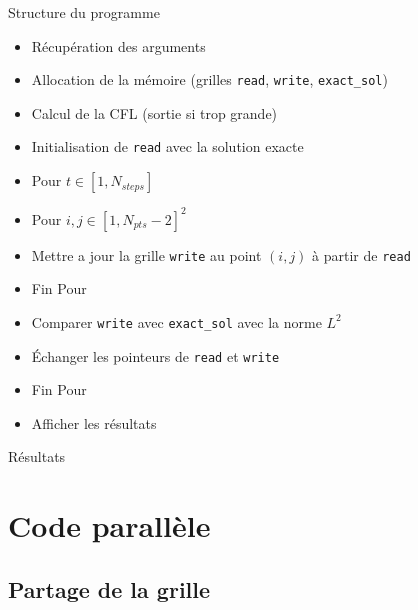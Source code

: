 \documentclass[17pt]{beamer}
\begin{document}
\begin{frame}{Structure du programme}
  \begin{itemize}
  \item Récupération des arguments
  \item Allocation de la mémoire (grilles \texttt{read}, \texttt{write}, \texttt{exact\_sol})
  \item Calcul de la CFL (sortie si trop grande)
  \item Initialisation de \texttt{read} avec la solution exacte
  \item[] Pour $t\in[1,N_{steps}]$
    \setlength\itemindent{35pt}
  \item[] Pour $i,j\in[1,N_{pts}-2]^2$
    \setlength\itemindent{70pt}
  \item Mettre a jour la grille \texttt{write} au point $(i,j)$ à partir de \texttt{read}
    \setlength\itemindent{35pt}
  \item[] Fin Pour
  \item Comparer \texttt{write} avec \texttt{exact\_sol} avec la norme $L^2$
  \item Échanger les pointeurs de \texttt{read} et \texttt{write}
    \setlength\itemindent{0pt}
  \item[] Fin Pour 
  \item Afficher les résultats
  \end{itemize}
\end{frame}

\begin{frame}{Résultats}
  
\end{frame}

\section{Code parallèle}

\subsection{Partage de la grille}
\end{document}
